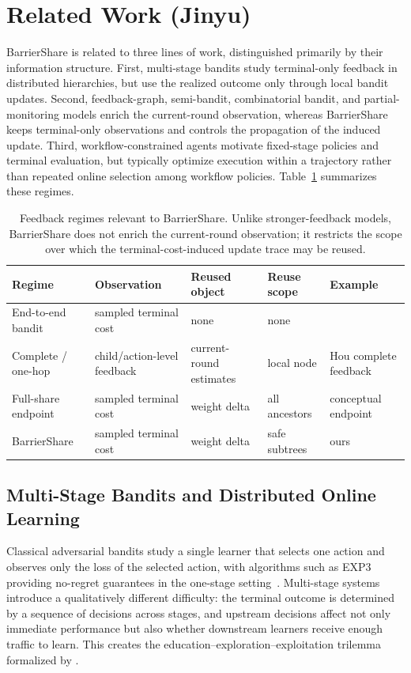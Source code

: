 \section{Related Work (Jinyu)}

BarrierShare is related to three lines of work, distinguished primarily by their information structure.
First, multi-stage bandits study terminal-only feedback in distributed hierarchies, but use the realized outcome only through local bandit updates.
Second, feedback-graph, semi-bandit, combinatorial bandit, and partial-monitoring models enrich the current-round observation, whereas BarrierShare keeps terminal-only observations and controls the propagation of the induced update.
Third, workflow-constrained agents motivate fixed-stage policies and terminal evaluation, but typically optimize execution within a trajectory rather than repeated online selection among workflow policies.
Table~\ref{tab:feedback_regimes} summarizes these regimes.

\begin{table}[t]
\centering
\small
\caption{Feedback regimes relevant to BarrierShare. Unlike stronger-feedback models, BarrierShare does not enrich the current-round observation; it restricts the scope over which the terminal-cost-induced update trace may be reused.}
\label{tab:feedback_regimes}
\begin{tabular}{lllll}
\toprule
Regime & Observation & Reused object & Reuse scope & Example \\
\midrule
End-to-end bandit & sampled terminal cost & none & none & \citet{hou2024distributed} \\
Complete / one-hop & child/action-level feedback & current-round estimates & local node & Hou complete feedback \\
Full-share endpoint & sampled terminal cost & weight delta & all ancestors & conceptual endpoint \\
BarrierShare & sampled terminal cost & weight delta & safe subtrees & ours \\
\bottomrule
\end{tabular}
\end{table}

\subsection{Multi-Stage Bandits and Distributed Online Learning}

Classical adversarial bandits study a single learner that selects one action and observes only the loss of the selected action, with algorithms such as EXP3 providing no-regret guarantees in the one-stage setting~\citep{auer2002nonstochastic}.
Multi-stage systems introduce a qualitatively different difficulty: the terminal outcome is determined by a sequence of decisions across stages, and upstream decisions affect not only immediate performance but also whether downstream learners receive enough traffic to learn.
This creates the education--exploration--exploitation trilemma formalized by \citet{hou2024distributed}.

